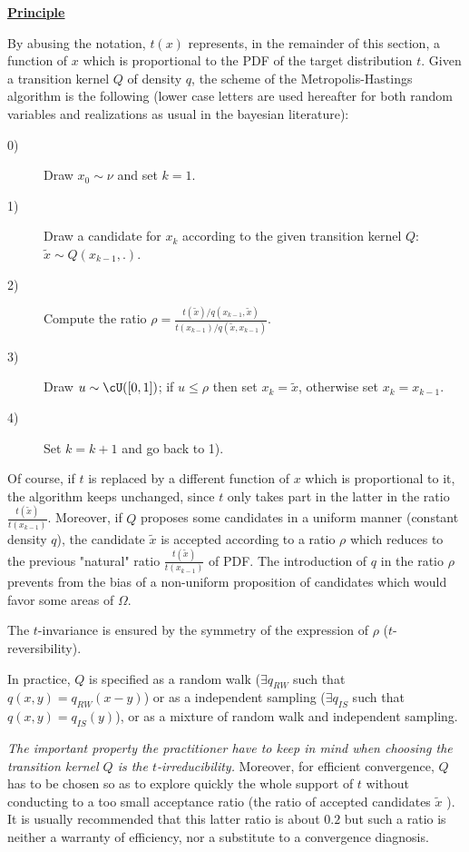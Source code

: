 {  \vspace{2mm}

  \underline{\textbf{Principle}} \vspace{2mm}

  By abusing the notation, $t(x)$ represents, in the remainder of this section, a function of $x$
  which is proportional to the PDF of the target distribution $t$.
  Given a transition kernel $Q$ of density $q$,
  the scheme of the Metropolis-Hastings algorithm is the following
  (lower case letters are used hereafter for both random variables and realizations
  as usual in the bayesian literature):
  \begin{description}
  \item[0)] Draw $x_0 \sim \nu$ and set $k = 1$.
  \item[1)] Draw a candidate for $x_k$ according to the given transition kernel $Q$:
    $\tilde{x} \sim Q(x_{k-1}, .)$.
  \item[2)] Compute the ratio $\rho = \displaystyle\frac{t(\tilde{x})/q(x_{k-1},\tilde{x})}
    {t(x_{k-1})/q(\tilde{x},x_{k-1})}$.
  \item[3)] Draw $u \sim \cU([0, 1])$; if $u \leq \rho$ then set $x_k = \tilde{x}$, otherwise
    set $x_k = x_{k-1}$.
  \item[4)] Set $k=k+1$ and go back to 1).
  \end{description}

  Of course, if $t$ is replaced by a different function of $x$ which is proportional to it,
  the algorithm keeps unchanged, since $t$ only takes part in the latter in the ratio
  $\frac{t(\tilde{x})}{t(x_{k-1})}$. Moreover,
  if $Q$ proposes some candidates in a uniform manner (constant
  density $q$), the candidate $\tilde{x}$ is accepted according to a ratio $\rho$
  which reduces to the previous "natural" ratio $\frac{t(\tilde{x})}{t(x_{k-1})}$
  of PDF. The introduction of $q$ in the ratio $\rho$ prevents from the bias of a non-uniform
  proposition of candidates which would favor some areas of $\Omega$.

  The $t$-invariance is ensured by the symmetry of the expression of $\rho$
  ($t$-reversibility).

  In practice, $Q$ is specified as a random walk ($\exists{}q_{RW}$ such that $q(x,y)=q_{RW}(x-y)$)
  or as a independent sampling ($\exists{}q_{IS}$ such that $q(x,y)=q_{IS}(y)$),
  or as a mixture of random walk and independent sampling.

  \emph{The important property the practitioner have to keep in mind when choosing the transition
    kernel $Q$ is the $t$-irreducibility.} Moreover, for efficient convergence, $Q$ has to be
  chosen so as to explore quickly the whole support of $t$ without conducting to a too
  small acceptance ratio (the ratio of accepted candidates $\tilde{x}$ ). It is usually
  recommended that this latter ratio is about $0.2$ but such a ratio is neither
  a warranty of efficiency, nor a substitute to a convergence diagnosis.\\

}
